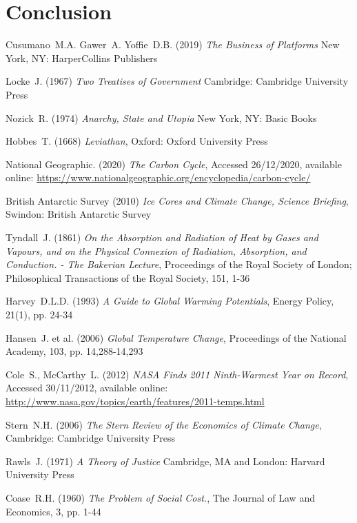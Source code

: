 \documentclass[11pt, oneside]{article}   	%
\begin{document}
\section{Conclusion}


\begin{thebibliography}{99}

 Cusumano~M.A. Gawer~A. Yoffie~D.B. (2019)
\emph{The Business of Platforms}
New York, NY: HarperCollins Publishers

 Locke~J. (1967)
\emph{Two Treatises of Government}
Cambridge: Cambridge University Press

 Nozick~R. (1974)
\emph{Anarchy, State and Utopia}
New York, NY: Basic Books

 Hobbes~T. (1668)
\emph{Leviathan},
Oxford: Oxford University Press

 National Geographic. (2020)
\emph{The Carbon Cycle},
Accessed 26/12/2020, available online: 
\url{https://www.nationalgeographic.org/encyclopedia/carbon-cycle/}
	
 British Antarctic Survey (2010)
\emph{Ice Cores and Climate Change, Science Briefing},
Swindon: British Antarctic Survey
	
 Tyndall~J. (1861)
\emph{On the Absorption and Radiation of Heat by Gases and Vapours, and on the Physical Connexion of Radiation, Absorption, and Conduction. - The Bakerian Lecture},
Proceedings of the Royal Society of London; Philosophical Transactions of the Royal Society, 151, 1-36
	
 Harvey~D.L.D. (1993)
\emph{A Guide to Global Warming Potentials},
Energy Policy, 21(1), pp. 24-34
	
 Hansen~J. et al. (2006)
\emph{Global Temperature Change},
Proceedings of the National Academy, 103, pp. 14,288-14,293
	
 Cole~S., McCarthy~L. (2012)
\emph{NASA Finds 2011 Ninth-Warmest Year on Record},
Accessed 30/11/2012, available online: 
\url{http://www.nasa.gov/topics/earth/features/2011-temps.html}
	
 Stern~N.H. (2006)
\emph{The Stern Review of the Economics of Climate Change},
Cambridge: Cambridge University Press
	
 Rawls~J. (1971)
\emph{A Theory of Justice}
Cambridge, MA and London: Harvard University Press
	
 Coase~R.H. (1960)
\emph{The Problem of Social Cost.},
The Journal of Law and Economics, 3, pp. 1-44
	

\end{thebibliography}
\end{document}
